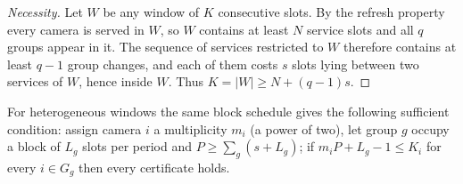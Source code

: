 \documentclass[final,5p,times,twocolumn]{elsarticle}
\newcommand{\Nc}{N}
\begin{document}
\begin{proof}[Necessity]
Let $W$ be any window of $K$ consecutive slots. By the refresh property every camera is served in
$W$, so $W$ contains at least $\Nc$ service slots and all $q$ groups appear in it. The sequence of
services restricted to $W$ therefore contains at least $q-1$ group changes, and each of them costs
$s$ slots lying between two services of $W$, hence inside $W$. Thus $K=|W|\ge \Nc+(q-1)s$.
\end{proof}

\noindent
For heterogeneous windows the same block schedule gives the following sufficient condition: assign
camera $i$ a multiplicity $m_i$ (a power of two), let group $g$ occupy a block of $L_g$ slots per
period and $P\ge\sum_g(s+L_g)$; if $m_iP+L_g-1\le K_i$ for every $i\in G_g$ then every certificate
holds.
\end{document}
